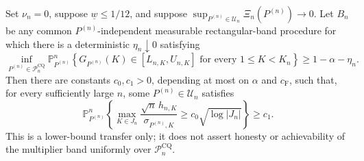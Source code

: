 Set \(\nu_n=0\), suppose \(\underline w\leq1/12\), and suppose \(\sup_{P^{(n)}\in\mathcal U_n}\Xi_n(P^{(n)})\to0\).  Let \(B_n\) be any common \(P^{(n)}\)-independent measurable rectangular-band procedure for which there is a deterministic \(\eta_n\downarrow0\) satisfying
\[
 \inf_{P^{(n)}\in\mathcal P_n^{\mathrm{CQ}}}
 \mathbb P_{P^{(n)}}^n\!\left\{
 G_{P^{(n)}}(K)\in[L_{n,K},U_{n,K}]
 \text{ for every }1\leq K<K_n\right\}
 \geq1-\alpha-\eta_n.
\]
Then there are constants \(c_0,c_1>0\), depending at most on \(\alpha\) and \(c_{\mathrm F}\), such that, for every sufficiently large \(n\), some \(P^{(n)}\in\mathcal U_n\) satisfies
\[
 \mathbb P_{P^{(n)}}^n\!\left\{
 \max_{K\in J_n}\frac{\sqrt n\,h_{n,K}}{\sigma_{P^{(n)},K}}
 \geq c_0\sqrt{\log|J_n|}\right\}\geq c_1.
\]
This is a lower-bound transfer only; it does not assert honesty or achievability of the multiplier band uniformly over \(\mathcal P_n^{\mathrm{CQ}}\).